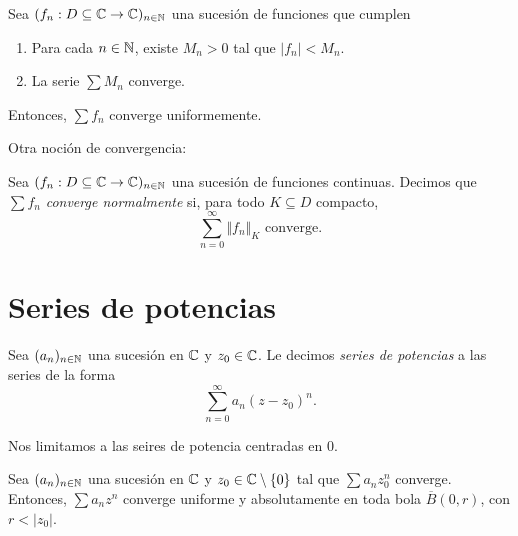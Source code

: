 \begin{proposition}
    Sea $(f_n: D \subseteq \mathbb{C} \to \mathbb{C})_{n \in \mathbb{N}}$ una sucesión de funciones que cumplen
    \begin{enumerate}
        \item Para cada $n \in \mathbb{N}$, existe $M_n > 0$ tal que $|f_n| < M_n$.
        \item La serie $\sum M_n$ converge.
    \end{enumerate}
    Entonces, $\sum f_n$ converge uniformemente.
\end{proposition}

Otra noción de convergencia:

\begin{definition}
    Sea $(f_n: D \subseteq \mathbb{C} \to \mathbb{C})_{n \in \mathbb{N}}$ una sucesión de funciones continuas. Decimos que $\sum f_n$ \emph{converge normalmente} si, para todo $K \subseteq D$ compacto,
    \begin{equation*}
        \sum_{n = 0}^{\infty } \Vert f_n \Vert_K \text{ converge}.
    \end{equation*}
\end{definition}


\section{Series de potencias}

\begin{definition}
    Sea $(a_n)_{n \in \mathbb{N}}$ una sucesión en $\mathbb{C}$ y $z_0 \in \mathbb{C}$. Le decimos \emph{series de potencias} a las series de la forma
    \begin{equation*}
        \sum_{n=0}^{\infty} a_n (z - z_0)^n.
    \end{equation*}
\end{definition}

Nos limitamos a las seires de potencia centradas en $0$.

\begin{lemma}[Abel]
    Sea $(a_n)_{n \in \mathbb{N}}$ una sucesión en $\mathbb{C}$ y $z_0 \in \mathbb{C} \setminus \{0\}$ tal que $\sum a_n z_0^n$ converge. Entonces, $\sum a_n z^n$ converge uniforme y absolutamente en toda bola $\overline{B}(0, r)$, con $r < |z_0|$.
\end{lemma}

